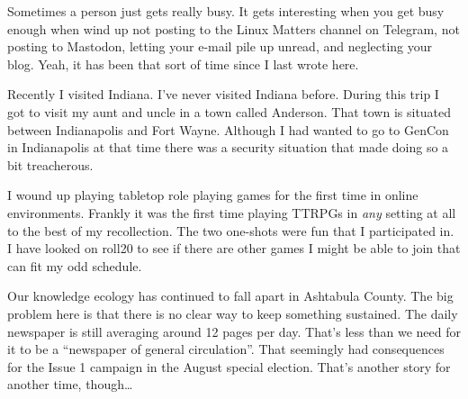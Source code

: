 Sometimes a person just gets really busy. It gets interesting when you
get busy enough when wind up not posting to the Linux Matters channel on
Telegram, not posting to Mastodon, letting your e-mail pile up unread,
and neglecting your blog. Yeah, it has been that sort of time since I
last wrote here.

Recently I visited Indiana. I've never visited Indiana before. During
this trip I got to visit my aunt and uncle in a town called Anderson.
That town is situated between Indianapolis and Fort Wayne. Although I
had wanted to go to GenCon in Indianapolis at that time there was a
security situation that made doing so a bit treacherous.

I wound up playing tabletop role playing games for the first time in
online environments. Frankly it was the first time playing TTRPGs in
\emph{any} setting at all to the best of my recollection. The two
one-shots were fun that I participated in. I have looked on roll20 to
see if there are other games I might be able to join that can fit my odd
schedule.

Our knowledge ecology has continued to fall apart in Ashtabula County.
The big problem here is that there is no clear way to keep something
sustained. The daily newspaper is still averaging around 12 pages per
day. That's less than we need for it to be a ``newspaper of general
circulation''. That seemingly had consequences for the Issue 1 campaign
in the August special election. That's another story for another time,
though\ldots{}
